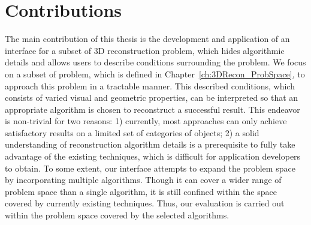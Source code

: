 \section{Contributions}
The main contribution of this thesis is the development and application of an interface for a subset of 3D reconstruction problem, which hides algorithmic details and allows users to describe conditions surrounding the problem. We focus on a subset of problem, which is defined in Chapter~\ref{ch:3DRecon_ProbSpace}, to approach this problem in a tractable manner. This described conditions, which consists of varied visual and geometric properties, can be interpreted so that an appropriate algorithm is chosen to reconstruct a successful result. This endeavor is non-trivial for two reasons: 1) currently, most approaches can only achieve satisfactory results on a limited set of categories of objects; 2) a solid understanding of reconstruction algorithm details is a prerequisite to fully take advantage of the existing techniques, which is difficult for application developers to obtain. To some extent, our interface attempts to expand the problem space by incorporating multiple algorithms. Though it can cover a wider range of problem space than a single algorithm, it is still confined within the space covered by currently existing techniques. Thus, our evaluation is carried out within the problem space covered by the selected algorithms.



